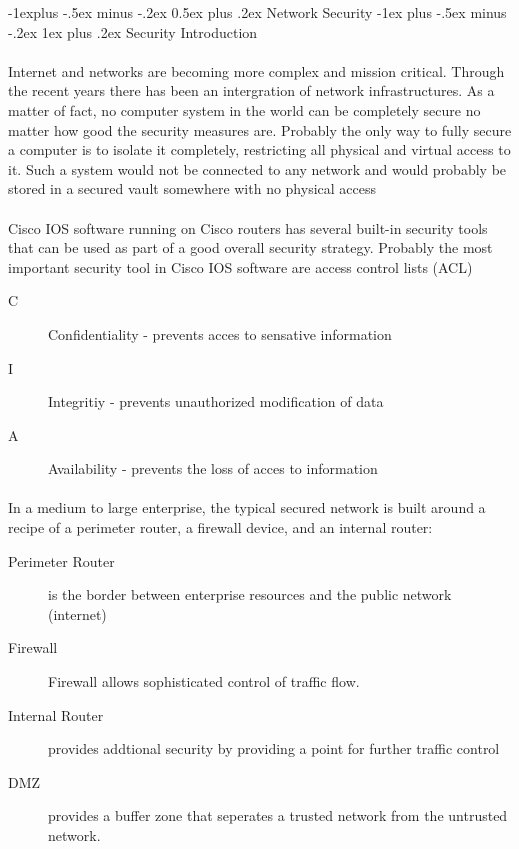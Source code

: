 \documentclass[10pt,landscape]{article}
\makeatletter
\renewcommand{\subsection}{\@startsection{subsection}{2}{0mm}%
                                {-1explus -.5ex minus -.2ex}%
                                {0.5ex plus .2ex}%
                                {\normalfont\normalsize\bfseries}}
\renewcommand{\subsubsection}{\@startsection{subsubsection}{3}{0mm}%
                                {-1ex plus -.5ex minus -.2ex}%
                                {1ex plus .2ex}%
                                {\normalfont\small\bfseries}}
\makeatother
\begin{document}
\begin{multicols}{3}
\subsection{Network Security}
\subsubsection{Security Introduction}
\paragraph{}
Internet and networks are becoming more complex and mission critical. Through the recent years there has been an intergration of network infrastructures.
As a matter of fact, no computer system in the world can be completely secure no matter how good the security measures are. Probably the only way to fully secure a computer is to isolate it completely, restricting all physical and virtual access to it. Such a system would not be connected to any network and would probably be stored in a secured vault somewhere with no physical access
\paragraph{}
Cisco IOS software running on Cisco routers has several built-in security tools that can be used as part of a good overall security strategy. Probably the most important security tool in Cisco IOS software are access control lists (ACL)
\begin{description}
	\item[C] Confidentiality - prevents acces to sensative information
	\item[I] Integritiy - prevents unauthorized modification of data
	\item[A] Availability  - prevents the loss of acces to information
\end{description}
\paragraph{}
In a medium to large enterprise, the typical secured network is built around a recipe of a perimeter router, a firewall device, and an internal router:
\begin{description}
	\item[Perimeter Router] is the border between enterprise resources and the public network (internet)
	\item[Firewall] Firewall allows sophisticated control of traffic flow.
	\item[Internal Router]  provides addtional security by providing a point for further traffic control
	\item[DMZ] provides a buffer zone that seperates a trusted network from the untrusted network.
\end{description}

\end{multicols}
\end{document}
